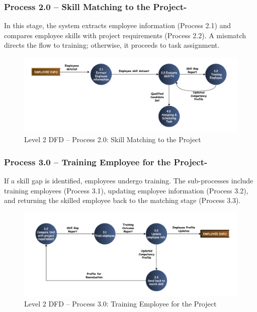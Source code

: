 \documentclass[12pt,a4paper]{article}
\begin{document}
\subsubsection*{Process 2.0 – Skill Matching to the Project-}
\noindent
In this stage, the system extracts employee information (Process 2.1) and compares employee skills with project requirements (Process 2.2). A mismatch directs the flow to training; otherwise, it proceeds to task assignment.

\begin{figure}[H]
    \centering
    \includegraphics[width=\textwidth]{Fig/process2_dfd.png}
    \caption{Level 2 DFD – Process 2.0: Skill Matching to the Project}
    \label{fig:level2_process2}
\end{figure}

\vspace{1.8cm}
\subsubsection*{Process 3.0 – Training Employee for the Project-}
\noindent
If a skill gap is identified, employees undergo training. The sub-processes include training employees (Process 3.1), updating employee information (Process 3.2), and returning the skilled employee back to the matching stage (Process 3.3).

\begin{figure}[H]
    \centering
    \includegraphics[width=\textwidth]{Fig/process3_dfd.png}
    \caption{Level 2 DFD – Process 3.0: Training Employee for the Project}
    \label{fig:level2_process3}
\end{figure}
\end{document}

